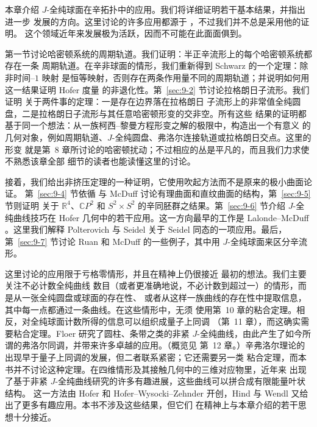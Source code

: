 
本章介绍 $J$-全纯球面在辛拓扑中的应用。我们将详细证明若干基本结果，并指出进一步
发展的方向。这里讨论的许多应用都源于
，不过我们并不总是采用他的证明。
这个领域近年来发展极为活跃，因而不可能在此面面俱到。

第一节讨论哈密顿系统的周期轨道。我们证明：半正辛流形上的每个哈密顿系统都存在一条
周期轨道。在辛非球面的情形，我们重新得到 Schwarz 的一个定理：除非时间--$1$ 映射
是恒等映射，否则存在两条作用量不同的周期轨道；并说明如何用这一结果证明 Hofer 度量
的非退化性。第~\ref{sec:9-2} 节讨论拉格朗日子流形。我们证明
关于两件事的定理：一是存在边界落在拉格朗日
子流形上的非常值全纯圆盘，二是拉格朗日子流形与其任意哈密顿形变的交非空。所有这些
结果的证明都基于同一个想法：从一族柯西--黎曼方程形变之解的极限中，构造出一个有意义
的几何对象，例如周期轨道、$J$-全纯圆盘、弗洛尔连接轨道或拉格朗日交点。这里的形变
就是第~8 章所讨论的哈密顿扰动；不过相应的丛是平凡的，而且我们力求使不熟悉该章全部
细节的读者也能读懂这里的讨论。

接着，我们给出非挤压定理的一种证明，它使用吹起方法而不是原来的极小曲面论证。
第~\ref{sec:9-4} 节依循  与 McDuff
 讨论有理曲面和直纹曲面的结构，第~\ref{sec:9-5} 节则证明
关于
$\mathbb R^4$、$\mathbb CP^2$ 和 $S^2\times S^2$ 的辛同胚群之结果。第~\ref{sec:9-6} 节介绍
$J$-全纯曲线技巧在 Hofer 几何中的若干应用。这一方向最早的工作是 Lalonde--McDuff
。这里我们解释 Polterovich  与 Seidel
 关于 Seidel 同态的一项应用。最后，第~\ref{sec:9-7} 节讨论 Ruan 
和 McDuff  的一些例子，其中用 $J$-全纯球面来区分辛流形。

这里讨论的应用限于亏格零情形，并且在精神上仍很接近
最初的想法。我们主要关注不必计数全纯曲线
数目（或者更准确地说，不必计数到超过一）的情形，而是从一张全纯圆盘或球面的存在性、
或者从这样一族曲线的存在性中提取信息，其中每一点都通过一条曲线。在这些情形中，无须
使用第~10 章的粘合定理。相反，对全纯球面计数所得的信息可以组织成量子上同调
（第~11 章），而这确实需要粘合定理。Floer 研究了圆柱、条带之类的非紧
$J$-全纯曲线，由此产生了如今所谓的弗洛尔同调，并带来许多卓越的应用。（概览见
第~12 章。）辛弗洛尔理论的出现早于量子上同调的发展，但二者联系紧密；它还需要另一类
粘合定理，而本书并不讨论这种定理。在四维情形及其接触几何中的三维对应物里，近年来
出现了基于非紧 $J$-全纯曲线研究的许多有趣进展，这些曲线可以拼合成有限能量叶状结构。
这一方法由 Hofer  和 Hofer--Wysocki--Zehnder  开创，Hind
 与 Wendl  又给出了更多有趣应用。本书不涉及这些结果，但它们
在精神上与本章介绍的若干思想十分接近。

